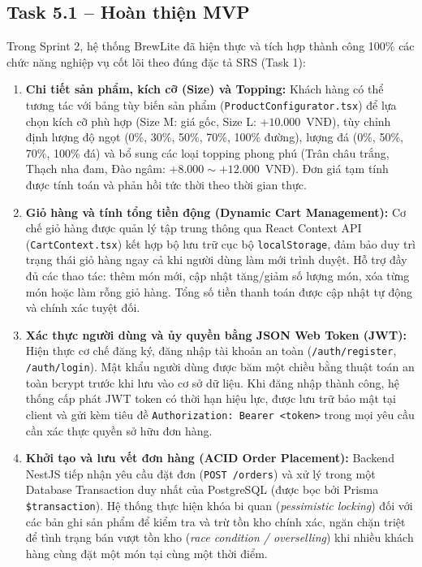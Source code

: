 \documentclass[a4paper]{article}
\begin{document}
\subsection{Task 5.1 – Hoàn thiện MVP}

Trong Sprint 2, hệ thống BrewLite đã hiện thực và tích hợp thành công 100\% các chức năng nghiệp vụ cốt lõi theo đúng đặc tả SRS (Task 1):

\begin{enumerate}
    \item \textbf{Chi tiết sản phẩm, kích cỡ (Size) và Topping:}
    Khách hàng có thể tương tác với bảng tùy biến sản phẩm (\texttt{ProductConfigurator.tsx}) để lựa chọn kích cỡ phù hợp (Size M: giá gốc, Size L: $+10.000$~VNĐ), tùy chỉnh định lượng độ ngọt (0\%, 30\%, 50\%, 70\%, 100\% đường), lượng đá (0\%, 50\%, 70\%, 100\% đá) và bổ sung các loại topping phong phú (Trân châu trắng, Thạch nha đam, Đào ngâm: $+8.000 \sim +12.000$~VNĐ). Đơn giá tạm tính được tính toán và phản hồi tức thời theo thời gian thực.

    \item \textbf{Giỏ hàng và tính tổng tiền động (Dynamic Cart Management):}
    Cơ chế giỏ hàng được quản lý tập trung thông qua React Context API (\texttt{CartContext.tsx}) kết hợp bộ lưu trữ cục bộ \texttt{localStorage}, đảm bảo duy trì trạng thái giỏ hàng ngay cả khi người dùng làm mới trình duyệt. Hỗ trợ đầy đủ các thao tác: thêm món mới, cập nhật tăng/giảm số lượng món, xóa từng món hoặc làm rỗng giỏ hàng. Tổng số tiền thanh toán được cập nhật tự động và chính xác tuyệt đối.

    \item \textbf{Xác thực người dùng và ủy quyền bằng JSON Web Token (JWT):}
    Hiện thực cơ chế đăng ký, đăng nhập tài khoản an toàn (\texttt{/auth/register}, \texttt{/auth/login}). Mật khẩu người dùng được băm một chiều bằng thuật toán an toàn bcrypt trước khi lưu vào cơ sở dữ liệu. Khi đăng nhập thành công, hệ thống cấp phát JWT token có thời hạn hiệu lực, được lưu trữ bảo mật tại client và gửi kèm tiêu đề \texttt{Authorization: Bearer <token>} trong mọi yêu cầu cần xác thực quyền sở hữu đơn hàng.

    \item \textbf{Khởi tạo và lưu vết đơn hàng (ACID Order Placement):}
    Backend NestJS tiếp nhận yêu cầu đặt đơn (\texttt{POST /orders}) và xử lý trong một Database Transaction duy nhất của PostgreSQL (được bọc bởi Prisma \texttt{\$transaction}). Hệ thống thực hiện khóa bi quan (\textit{pessimistic locking}) đối với các bản ghi sản phẩm để kiểm tra và trừ tồn kho chính xác, ngăn chặn triệt để tình trạng bán vượt tồn kho (\textit{race condition / overselling}) khi nhiều khách hàng cùng đặt một món tại cùng một thời điểm.


\end{enumerate}
\end{document}
